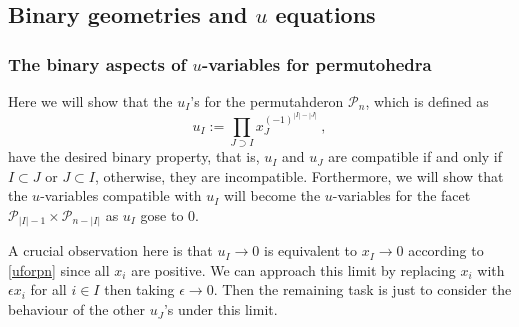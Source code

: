 \documentclass[hidelinks,12pt]{article}
\begin{document}
\subsection{Binary geometries and $u$ equations}


\subsubsection{The binary aspects of $u$-variables for permutohedra}

Here we will show that the $u_{I}$'s for the permutahderon $\mathscr{P}_{n}$, which is defined as 
\begin{equation}
   u_{I}:= \prod_{J\supset I}x_J^{(-1)^{|I|-|J|}} \:, \label{uforpn}
\end{equation}
have the desired binary property, that is, $u_{I}$ and $u_{J}$ are compatible if and only if $I \subset J$ or $J\subset I$, otherwise, they are incompatible. Forthermore, we will show that the $u$-variables compatible with $u_{I}$ will become the $u$-variables for the facet $\mathscr{P}_{\lvert I \rvert-1}\times \mathscr{P}_{n-\lvert I\rvert}$ as $u_{I}$ gose to 0.

A crucial observation here is that $u_{I}\to 0$ is equivalent to $x_{I}\to 0 $ according to \eqref{uforpn} since all $x_{i}$ are positive. We can approach this limit by replacing $x_{i}$ with $ \epsilon x_{i}$ for all $i\in I$ then taking $\epsilon \to 0$. Then the remaining task is just to consider the behaviour of the other $u_{J}$'s under this limit. 
\end{document}
